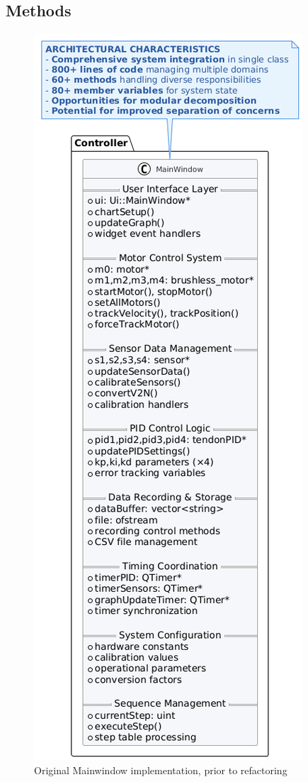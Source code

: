 \subsection{Methods}
\begin{figure}
    \centering
    \includegraphics[width=\linewidth]{images/Software documentation/old code/mainwindow2.png}
    \caption{Original Mainwindow implementation, prior to refactoring}
    \label{fig:oldmainwindow}
\end{figure}
